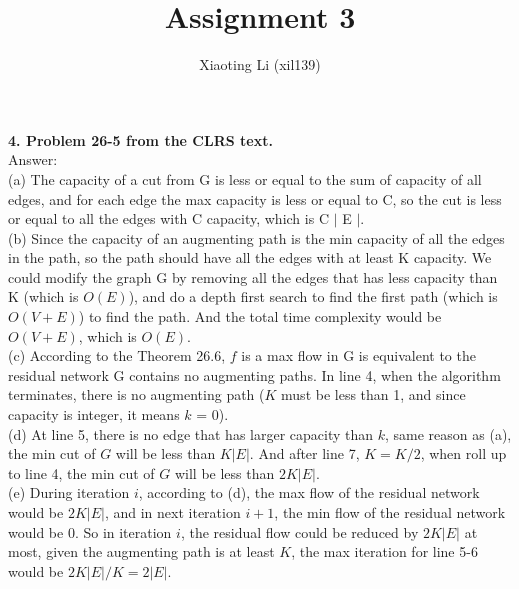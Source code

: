 \documentclass{article}
\title{Assignment 3}
\author{Xiaoting Li (xil139)}
\date{}
\begin{document}
\maketitle
\textbf{4. Problem 26-5 from the CLRS text.} \\
\noindent
Answer: \\
(a) The capacity of a cut from G is less or equal to the sum of capacity of all edges, and for each edge the max capacity is less or equal to C, so the cut is less or equal to all the edges with C capacity, which is C $|$ E $|$.\\
\newline
(b) Since the capacity of an augmenting path is the min capacity of all the edges in the path, so the path should have all the edges with at least K capacity. We could modify the graph G by removing all the edges that has less capacity than K (which is $O(E)$), and do a depth first search to find the first path (which is $O(V+E)$) to find the path. And the total time complexity would be $O(V+E)$, which is $O(E)$.  \\
\newline
(c) According to the Theorem 26.6, $f$ is a max flow in G is equivalent to the residual network G contains no augmenting paths. In line 4, when the algorithm terminates, there is no augmenting path ($K$ must be less than 1, and since capacity is integer, it means $k$ = 0).\\
\newline
(d) At line 5, there is no edge that has larger capacity than $k$, same reason as (a), the min cut of $G$ will be less than $K |E|$. And after line 7, $K = K/2$, when roll up to line 4, the min cut of $G$ will be less than $2K |E|$.\\
\newline
(e) During iteration $i$, according to (d), the max flow of the residual network would be $2K |E|$, and in next iteration $i+1$, the min flow of the residual network would be 0. So in iteration $i$, the residual flow could be reduced by  $2K |E|$ at most, given the augmenting path is at least $K$, the max iteration for line 5-6 would be $2K |E| / K =2 |E| $.\\
\newline
\end{document}
